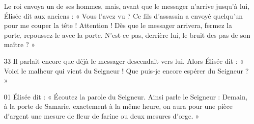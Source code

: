 Le roi envoya un de ses hommes, mais, avant que le messager n’arrive jusqu’à lui, Élisée dit aux anciens : « Vous l’avez vu ? Ce fils d’assassin a envoyé quelqu’un pour me couper la tête ! Attention ! Dès que le messager arrivera, fermez la porte, repoussez-le avec la porte. N’est-ce pas, derrière lui, le bruit des pas de son maître ? »

33 Il parlait encore que déjà le messager descendait vers lui. Alors Élisée dit : « Voici le malheur qui vient du Seigneur ! Que puis-je encore espérer du Seigneur ? »

01 Élisée dit : « Écoutez la parole du Seigneur. Ainsi parle le Seigneur : Demain, à la porte de Samarie, exactement à la même heure, on aura pour une pièce d’argent une mesure de fleur de farine ou deux mesures d’orge. »

